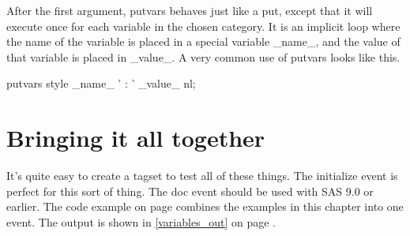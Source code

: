 After the first argument, putvars behaves just like a put,
except that it will execute once for each variable in the
chosen category.  It is an implicit loop where the name of
the variable is placed in a special variable \_name\_, and the
value of that variable is placed in \_value\_.  A very common
use of putvars looks like this.

\begin{sfvcode}
   putvars style _name_ ' : ' _value_ nl;
\end{sfvcode}

\section{Bringing it all together}
It's quite easy to create a tagset to test all of these things.  The initialize
event is perfect for this sort of thing. The doc event should be used with SAS 9.0 or earlier.
The code example on page \pageref{variables example} combines the examples in this chapter 
into one event.  The output is shown in \ref{variables_out} on page \pageref{variables_out}.  

